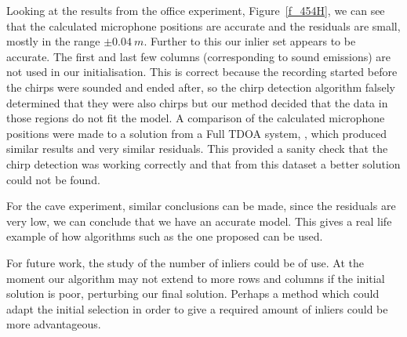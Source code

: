 \documentclass{article}
\begin{document}
Looking at the results from the office experiment, Figure~\ref{f_454H}, we can see that the calculated microphone positions are accurate and the residuals are small, mostly in the range $\pm 0.04~m$. Further to this our inlier set appears to be accurate. The first and last few columns (corresponding to sound emissions) are not used in our initialisation. This is correct because the recording started before the chirps were sounded and ended after, so the chirp detection algorithm falsely determined that they were also chirps but our method decided that the data in those regions do not fit the model. A comparison of the calculated microphone positions were made to a solution from a Full TDOA system, \cite{kuang2013stratified}, which produced similar results and very similar residuals. This provided a sanity check that the chirp detection was working correctly and that from this dataset a better solution could not be found.

For the cave experiment, similar conclusions can be made, since the residuals are very low, we can conclude that we have an accurate model. This gives a real life example of how algorithms such as the one proposed can be used.

For future work, the study of the number of inliers could be of use. At the moment our algorithm may not extend to more rows and columns if the initial solution is poor, perturbing our final solution. Perhaps a method which could adapt the initial selection in order to give a required amount of inliers could be more advantageous.





\vfill\pagebreak



%

\end{document}
